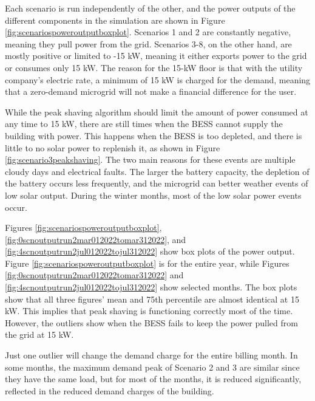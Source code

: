 \documentclass[conference]{IEEEtran}
\begin{document}
		Each scenario is run independently of the other, and the power outputs of the different components in the simulation are shown in Figure \ref{fig:scenariospoweroutputboxplot}. Scenarios 1 and 2 are constantly negative, meaning they pull power from the grid. Scenarios 3-8, on the other hand, are mostly positive or limited to -15 kW, meaning it either exports power to the grid or consumes only 15 kW. The reason for the 15-kW floor is that with the utility company's electric rate, a minimum of 15 kW is charged for the demand, meaning that a zero-demand microgrid will not make a financial difference for the user. 
		
		While the peak shaving algorithm should limit the amount of power consumed at any time to 15 kW, there are still times when the BESS cannot supply the building with power. This happens when the BESS is too depleted, and there is little to no solar power to replenish it, as shown in Figure \ref{fig:scenario3peakshaving}. The two main reasons for these events are multiple cloudy days and electrical faults. The larger the battery capacity, the depletion of the battery occurs less frequently, and the microgrid can better weather events of low solar output. During the winter months, most of the low solar power events occur. 
		
		Figures \ref{fig:scenariospoweroutputboxplot}, \ref{fig:0scnoutputrun2mar012022tomar312022}, and \ref{fig:4scnoutputrun2jul012022tojul312022} show box plots of the power output. Figure \ref{fig:scenariospoweroutputboxplot} is for the entire year, while Figures \ref{fig:0scnoutputrun2mar012022tomar312022} and \ref{fig:4scnoutputrun2jul012022tojul312022} show selected months. The box plots show that all three figures' mean and 75th percentile are almost identical at 15 kW. This implies that peak shaving is functioning correctly most of the time. However, the outliers show when the BESS fails to keep the power pulled from the grid at 15 kW. 
		
		Just one outlier will change the demand charge for the entire billing month. In some months, the maximum demand peak of Scenario 2 and 3 are similar since they have the same load, but for most of the months, it is reduced significantly, reflected in the reduced demand charges of the building.  \\ %
		
\end{document}
